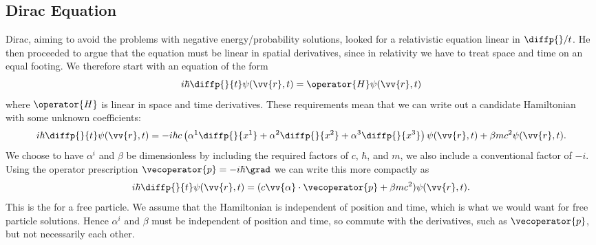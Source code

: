 \documentclass[fleqn]{NotesClass}
\begin{document}
\begin{appendices}
        \subsection{Dirac Equation}
        Dirac, aiming to avoid the problems with negative energy/probability solutions, looked for a relativistic equation linear in \(\diffp{}/{t}\).
        He then proceeded to argue that the equation must be linear in spatial derivatives, since in relativity we have to treat space and time on an equal footing.
        We therefore start with an equation of the form
        \begin{equation}
            i\hbar\diffp{}{t}\psi(\vv{r}, t) = \operator{H}\psi(\vv{r}, t)
        \end{equation}
        where \(\operator{H}\) is linear in space and time derivatives.
        These requirements mean that we can write out a candidate Hamiltonian with some unknown coefficients:
        \begin{equation}
            i\hbar\diffp{}{t}\psi(\vv{r}, t) = -i\hbar c\left( \alpha^1\diffp{}{x^1} + \alpha^2\diffp{}{x^2} + \alpha^3\diffp{}{x^3} \right) \psi(\vv{r}, t) + \beta mc^2 \psi(\vv{r}, t).
        \end{equation}
        We choose to have \(\alpha^i\) and \(\beta\) be dimensionless by including the required factors of \(c\), \(\hbar\), and \(m\), we also include a conventional factor of \(-i\).
        Using the operator prescription \(\vecoperator{p} = -i\hbar\grad\) we can write this more compactly as
        \begin{equation}
            i\hbar\diffp{}{t}\psi(\vv{r}, t) = (c\vv{\alpha} \cdot \vecoperator{p} + \beta mc^2) \psi(\vv{r}, t).
        \end{equation}
        This is the  for a free particle.
        We assume that the Hamiltonian is independent of position and time, which is what we would want for free particle solutions.
        Hence \(\alpha^i\) and \(\beta\) must be independent of position and time, so commute with the derivatives, such as \(\vecoperator{p}\), but not necessarily each other.
        

\end{appendices}
\end{document}
